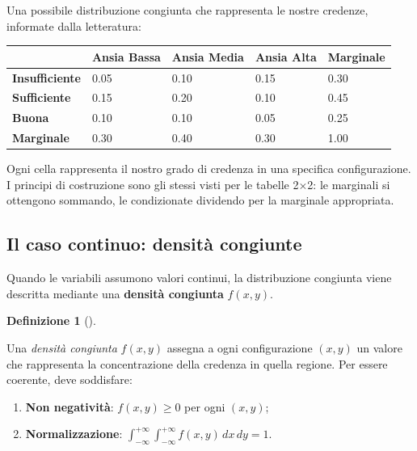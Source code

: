 \documentclass[
  italian,
  letterpaper,
  a4paper,
  11pt,
  open=any]{scrbook}
\newcounter{none} %
\providecommand{\tightlist}{%
  \setlength{\itemsep}{0pt}\setlength{\parskip}{0pt}}
\theoremstyle{plain}
\theoremstyle{definition}
\theoremstyle{definition}
\newtheorem{definition}{Definizione}[chapter]
\theoremstyle{remark}
\begin{document}
Una possibile distribuzione congiunta che rappresenta le nostre
credenze, informate dalla letteratura:

{\def\LTcaptype{none} %
\begin{longtable}[]{@{}lllll@{}}
\toprule\noalign{}
& Ansia Bassa & Ansia Media & Ansia Alta & Marginale \\
\midrule\noalign{}
\endhead
\bottomrule\noalign{}
\endlastfoot
\textbf{Insufficiente} & 0.05 & 0.10 & 0.15 & 0.30 \\
\textbf{Sufficiente} & 0.15 & 0.20 & 0.10 & 0.45 \\
\textbf{Buona} & 0.10 & 0.10 & 0.05 & 0.25 \\
\textbf{Marginale} & 0.30 & 0.40 & 0.30 & 1.00 \\
\end{longtable}
}

Ogni cella rappresenta il nostro grado di credenza in una specifica
configurazione. I principi di costruzione sono gli stessi visti per le
tabelle 2×2: le marginali si ottengono sommando, le condizionate
dividendo per la marginale appropriata.

\subsection{Il caso continuo: densità
congiunte}\label{il-caso-continuo-densituxe0-congiunte}

Quando le variabili assumono valori continui, la distribuzione congiunta
viene descritta mediante una \textbf{densità congiunta} \(f(x,y)\).

\begin{definition}[]\protect\hypertarget{def-joint-density}{}\label{def-joint-density}

Una \emph{densità congiunta} \(f(x,y)\) assegna a ogni configurazione
\((x,y)\) un valore che rappresenta la concentrazione della credenza in
quella regione. Per essere coerente, deve soddisfare:

\begin{enumerate}
\def\labelenumi{\arabic{enumi}.}
\tightlist
\item
  \textbf{Non negatività}: \(f(x,y) \geq 0\) per ogni \((x,y)\);
\item
  \textbf{Normalizzazione}:
  \(\int_{-\infty}^{+\infty} \int_{-\infty}^{+\infty} f(x,y)\,dx\,dy = 1\).
\end{enumerate}

\end{definition}
\end{document}
